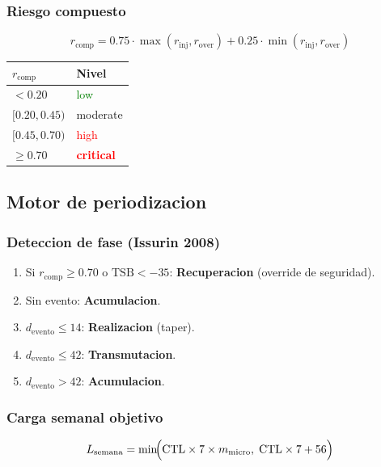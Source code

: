 \documentclass[12pt, a4paper]{article}
\begin{document}
\subsubsection{Riesgo compuesto}

\[
  r_{\text{comp}} =
    0.75 \cdot \max(r_{\text{inj}}, r_{\text{over}})
  + 0.25 \cdot \min(r_{\text{inj}}, r_{\text{over}})
\]

\begin{center}
\begin{tabular}{ll}
\toprule
$r_{\text{comp}}$ & Nivel \\
\midrule
$< 0.20$      & \textcolor{green}{low} \\
$[0.20, 0.45)$ & \textcolor{amber}{moderate} \\
$[0.45, 0.70)$ & \textcolor{red}{high} \\
$\geq 0.70$   & \textbf{\textcolor{red}{critical}} \\
\bottomrule
\end{tabular}
\end{center}

\subsection{Motor de periodizacion}

\subsubsection{Deteccion de fase (Issurin 2008)}

\begin{enumerate}
  \item Si $r_{\text{comp}} \geq 0.70$ o $\text{TSB} < -35$:
        \textbf{Recuperacion} (override de seguridad).
  \item Sin evento: \textbf{Acumulacion}.
  \item $d_{\text{evento}} \leq 14$: \textbf{Realizacion} (taper).
  \item $d_{\text{evento}} \leq 42$: \textbf{Transmutacion}.
  \item $d_{\text{evento}} > 42$: \textbf{Acumulacion}.
\end{enumerate}

\subsubsection{Carga semanal objetivo}

\[
  L_{\text{semana}} = \min\!\Bigl(\text{CTL} \times 7 \times m_{\text{micro}},\;
  \text{CTL} \times 7 + 56\Bigr)
\]
\end{document}
